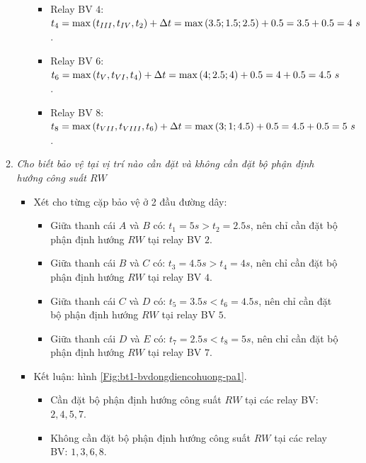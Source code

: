 \documentclass[12pt,a4paper]{article}
\begin{document}
\begin{enumerate}
\begin{enumerate}[\it a.]
\begin{itemize}
\begin{itemize}
								\item Relay BV $4$: $t_4 = \max\left({t_{III}, t_{IV}, t_2}\right) + \Delta t = \max\left({3.5; 1.5; 2.5}\right) + 0.5 = 3.5 + 0.5 = 4 ~s$.
								
								\item Relay BV $6$: $t_6 = \max\left({t_{V}, t_{VI}, t_4}\right) + \Delta t = \max\left({4; 2.5; 4}\right) + 0.5 = 4 + 0.5 = 4.5 ~s$.
								
								\item Relay BV $8$: $t_8 = \max\left({t_{VII}, t_{VIII}, t_6}\right) + \Delta t = \max\left({3; 1; 4.5}\right) + 0.5 = 4.5 + 0.5 = 5 ~s$.
							\end{itemize}
					\end{itemize}
					
					\item \emph{Cho biết bảo vệ tại vị trí nào cần đặt và không cần đặt bộ phận định hướng công suất $RW$}
						\begin{itemize}
							\item Xét cho từng cặp bảo vệ ở 2 đầu đường dây:						
							\begin{itemize}
								\item Giữa thanh cái $A$ và $B$ có: $t_1 = 5 \unit{s} > t_2 = 2.5 \unit{s}$, nên chỉ cần đặt bộ phận định hướng $RW$ tại relay BV $2$.
								
								\item Giữa thanh cái $B$ và $C$ có: $t_3 = 4.5 \unit{s} > t_4 = 4 \unit{s}$, nên chỉ cần đặt bộ phận định hướng $RW$ tại relay BV $4$.
								
								\item Giữa thanh cái $C$ và $D$ có: $t_5 = 3.5 \unit{s} < t_6 = 4.5 \unit{s}$, nên chỉ cần đặt bộ phận định hướng $RW$ tại relay BV $5$.
								
								\item Giữa thanh cái $D$ và $E$ có: $t_7 = 2.5 \unit{s} < t_8 = 5 \unit{s}$, nên chỉ cần đặt bộ phận định hướng $RW$ tại relay BV $7$.
								\end{itemize}
								
							\item Kết luận: hình \ref{Fig:bt1-bvdongdiencohuong-pa1}.
								\begin{itemize}
									\item Cần đặt bộ phận định hướng công suất $RW$ tại các relay BV: $2, 4, 5, 7$.
									
									\item Không cần đặt bộ phận định hướng công suất $RW$ tại các relay BV: $1, 3, 6, 8$.
								\end{itemize}
							

\end{itemize}
\end{enumerate}
\end{enumerate}
\end{document}
